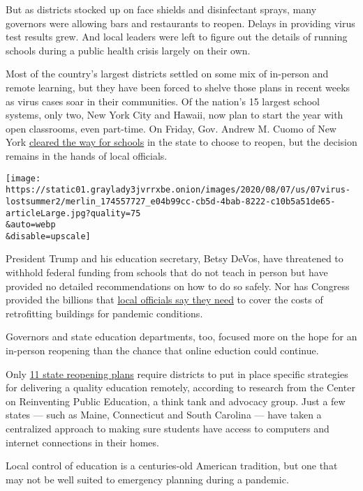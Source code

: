 But as districts stocked up on face shields and disinfectant sprays,
many governors were allowing bars and restaurants to reopen. Delays in
providing virus test results grew. And local leaders were left to figure
out the details of running schools during a public health crisis largely
on their own.

Most of the country's largest districts settled on some mix of in-person
and remote learning, but they have been forced to shelve those plans in
recent weeks as virus cases soar in their communities. Of the nation's
15 largest school systems, only two, New York City and Hawaii, now plan
to start the year with open classrooms, even part-time. On Friday, Gov.
Andrew M. Cuomo of New York
\href{https://www.nytimes3xbfgragh.onion/2020/08/07/nyregion/cuomo-schools-reopening.html}{cleared
the way for schools} in the state to choose to reopen, but the decision
remains in the hands of local officials.

\texttt{[image: https://static01.graylady3jvrrxbe.onion/images/2020/08/07/us/07virus-lostsummer2/merlin\_174557727\_e04b99cc-cb5d-4bab-8222-c10b5a51de65-articleLarge.jpg?quality=75\\\&auto=webp\\\&disable=upscale]}

President Trump and his education secretary, Betsy DeVos, have
threatened to withhold federal funding from schools that do not teach in
person but have provided no detailed recommendations on how to do so
safely. Nor has Congress provided the billions that
\href{https://www.nytimes3xbfgragh.onion/2020/07/09/us/schools-reopening-trump.html}{local
officials say they need} to cover the costs of retrofitting buildings
for pandemic conditions.

Governors and state education departments, too, focused more on the hope
for an in-person reopening than the chance that online eduction could
continue.

Only
\href{https://www.crpe.org/thelens/states-must-take-decisive-action-avert-coming-education-crisis}{11
state reopening plans} require districts to put in place specific
strategies for delivering a quality education remotely, according to
research from the Center on Reinventing Public Education, a think tank
and advocacy group. Just a few states --- such as Maine, Connecticut and
South Carolina --- have taken a centralized approach to making sure
students have access to computers and internet connections in their
homes.

Local control of education is a centuries-old American tradition, but
one that may not be well suited to emergency planning during a pandemic.

